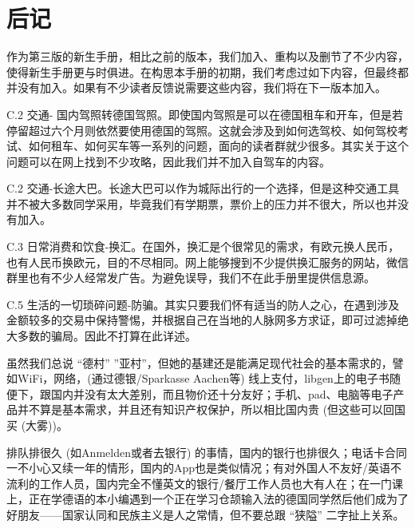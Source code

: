 
\chapter*{后记}

  作为第三版的新生手册，相比之前的版本，我们加入、重构以及删节了不少内容，使得新生手册更与时俱进。在构思本手册的初期，我们考虑过如下内容，但最终都并没有加入。如果有不少读者反馈说需要这些内容，我们将在下一版本加入。

  C.2 交通- 国内驾照转德国驾照。即使国内驾照是可以在德国租车和开车，但是若停留超过六个月则依然要使用德国的驾照。这就会涉及到如何选驾校、如何驾校考试、如何租车、如何买车等一系列的问题，面向的读者群就少很多。其实关于这个问题可以在网上找到不少攻略，因此我们并不加入自驾车的内容。

  C.2 交通-长途大巴。长途大巴可以作为城际出行的一个选择，但是这种交通工具并不被大多数同学采用，毕竟我们有学期票，票价上的压力并不很大，所以也并没有加入。

  C.3 日常消费和饮食-换汇。在国外，换汇是个很常见的需求，有欧元换人民币，也有人民币换欧元，目的不尽相同。网上能够搜到不少提供换汇服务的网站，微信群里也有不少人经常发广告。为避免误导，我们不在此手册里提供信息源。

  C.5 生活的一切琐碎问题-防骗。其实只要我们怀有适当的防人之心，在遇到涉及金额较多的交易中保持警惕，并根据自己在当地的人脉网多方求证，即可过滤掉绝大多数的骗局。因此不打算在此详述。

  虽然我们总说 “德村” ”亚村”，但她的基建还是能满足现代社会的基本需求的，譬如WiFi，网络，(通过德银/Sparkasse Aachen等) 线上支付，libgen上的电子书随便下，跟国内并没有太大差别，而且物价还十分友好；手机、pad、电脑等电子产品并不算是基本需求，并且还有知识产权保护，所以相比国内贵 (但这些可以回国买 (大雾))。

  排队排很久 (如Anmelden或者去银行) 的事情，国内的银行也排很久；电话卡合同一不小心又续一年的情形，国内的App也是类似情况；有对外国人不友好/英语不流利的工作人员，国内完全不懂英文的银行/餐厅工作人员也大有人在；在一门课上，正在学德语的本小编遇到一个正在学习仓颉输入法的德国同学然后他们成为了好朋友——国家认同和民族主义是人之常情，但不要总跟 “狭隘” 二字扯上关系。
